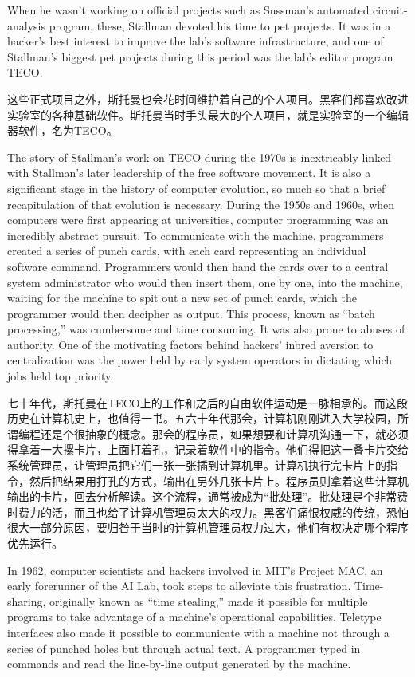 \ifdefined\eng
When he wasn't working on official projects such as \ifdefined\vone Sussman's automated circuit-analysis program, \fi\ifdefined\vtwo these, \fi Stallman devoted his time to pet projects. It was in a hacker's best interest to improve the lab's software infrastructure, and one of Stallman's biggest pet projects during this period was the lab's editor program TECO.
\fi

\ifdefined\chs
这些正式项目之外，斯托曼也会花时间维护着自己的个人项目。黑客们都喜欢改进实验室的各种基础软件。斯托曼当时手头最大的个人项目，就是实验室的一个编辑器软件，名为TECO。
\fi

\ifdefined\eng
The story of Stallman's work on TECO during the 1970s is inextricably linked with Stallman's later leadership of the free software movement. It is also a significant stage in the history of computer evolution, so much so that a brief recapitulation of that evolution is necessary. During the 1950s and 1960s, when computers were first appearing at universities, computer programming was an incredibly abstract pursuit. To communicate with the machine, programmers created a series of punch cards, with each card representing an individual software command. Programmers would then hand the cards over to a central system administrator who would then insert them, one by one, into the machine, waiting for the machine to spit out a new set of punch cards, which the programmer would then decipher as output. This process, known as ``batch processing,'' was cumbersome and time consuming. It was also prone to abuses of authority. One of the motivating factors behind hackers' inbred aversion to centralization was the power held by early system operators in dictating which jobs held top priority.
\fi

\ifdefined\chs
七十年代，斯托曼在TECO上的工作和之后的自由软件运动是一脉相承的。而这段历史在计算机史上，也值得一书。五六十年代那会，计算机刚刚进入大学校园，所谓编程还是个很抽象的概念。那会的程序员，如果想要和计算机沟通一下，就必须得拿着一大摞卡片，上面打着孔，记录着软件中的指令。他们得把这一叠卡片交给系统管理员，让管理员把它们一张一张插到计算机里。计算机执行完卡片上的指令，然后把结果用打孔的方式，输出在另外几张卡片上。程序员则拿着这些计算机输出的卡片，回去分析解读。这个流程，通常被成为``批处理''。批处理是个非常费时费力的活，而且也给了计算机管理员太大的权力。黑客们痛恨权威的传统，恐怕很大一部分原因，要归咎于当时的计算机管理员权力过大，他们有权决定哪个程序优先运行。
\fi

\ifdefined\eng
In 1962, computer scientists and hackers involved in MIT's Project MAC, an early forerunner of the AI Lab, took steps to alleviate this frustration. Time-sharing, originally known as ``time stealing,'' made it possible for multiple programs to take advantage of a machine's operational capabilities. Teletype interfaces also made it possible to communicate with a machine not through a series of punched holes but through actual text. A programmer typed in commands and read the line-by-line output generated by the machine.
\fi

